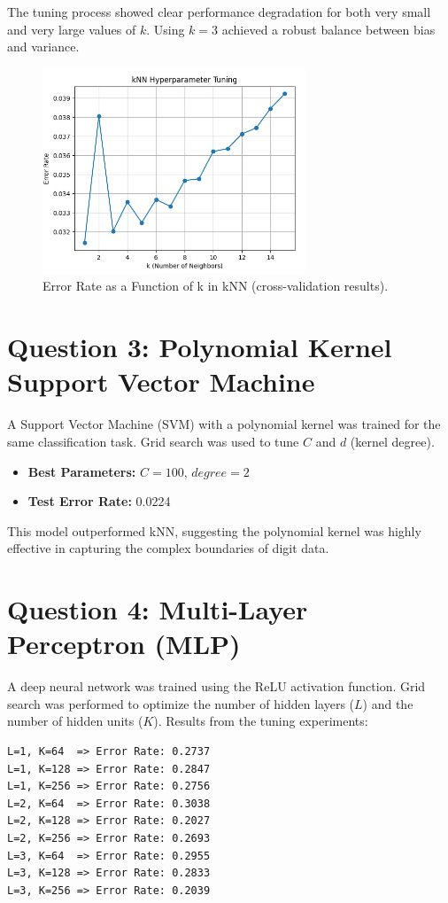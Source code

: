 \documentclass[a4paper,12pt]{article}
\begin{document}
The tuning process showed clear performance degradation for both very small and very large values of \(k\). Using \(k=3\) achieved a robust balance between bias and variance.
\begin{figure}[h!]
\centering
\includegraphics[width=0.7\textwidth]{knn_error_vs_k.png}
\caption{Error Rate as a Function of k in kNN (cross-validation results).}
\label{fig:knn_plot}
\end{figure}

\section*{Question 3: Polynomial Kernel Support Vector Machine}
A Support Vector Machine (SVM) with a polynomial kernel was trained for the same classification task. Grid search was used to tune \(C\) and \(d\) (kernel degree).

\begin{itemize}
  \item \textbf{Best Parameters:} $C=100$, $degree=2$
  \item \textbf{Test Error Rate:} 0.0224
\end{itemize}

This model outperformed kNN, suggesting the polynomial kernel was highly effective in capturing the complex boundaries of digit data.

\section*{Question 4: Multi-Layer Perceptron (MLP)}
A deep neural network was trained using the ReLU activation function. Grid search was performed to optimize the number of hidden layers (\(L\)) and the number of hidden units (\(K\)). Results from the tuning experiments:

\begin{verbatim}
L=1, K=64  => Error Rate: 0.2737
L=1, K=128 => Error Rate: 0.2847
L=1, K=256 => Error Rate: 0.2756
L=2, K=64  => Error Rate: 0.3038
L=2, K=128 => Error Rate: 0.2027
L=2, K=256 => Error Rate: 0.2693
L=3, K=64  => Error Rate: 0.2955
L=3, K=128 => Error Rate: 0.2833
L=3, K=256 => Error Rate: 0.2039
\end{verbatim}
\end{document}
